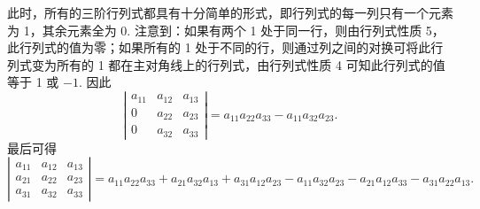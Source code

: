 \documentclass[UTF8,12pt,a4paper,fontset=fandol]{ctexart}
\begin{document}
此时，所有的三阶行列式都具有十分简单的形式，即行列式的每一列只有一个元素为 1，其余元素全为 0. 注意到：如果有两个 1 处于同一行，则由行列式性质 5，此行列式的值为零；如果所有的 1 处于不同的行，则通过列之间的对换可将此行列式变为所有的 1 都在主对角线上的行列式，由行列式性质 4 可知此行列式的值等于 1 或 $-1$. 因此
\[
\left|\begin{array}{ccc}
a_{11} & a_{12} & a_{13}\\
0 & a_{22} & a_{23}\\
0 & a_{32} & a_{33}
\end{array}\right|
=a_{11}a_{22}a_{33}-a_{11}a_{32}a_{23}.
\]
最后可得
\[
\left|\begin{array}{ccc}
a_{11} & a_{12} & a_{13}\\
a_{21} & a_{22} & a_{23}\\
a_{31} & a_{32} & a_{33}
\end{array}\right|
=a_{11}a_{22}a_{33}+a_{21}a_{32}a_{13}+a_{31}a_{12}a_{23}
-a_{11}a_{32}a_{23}-a_{21}a_{12}a_{33}-a_{31}a_{22}a_{13}.
\]
\end{document}
